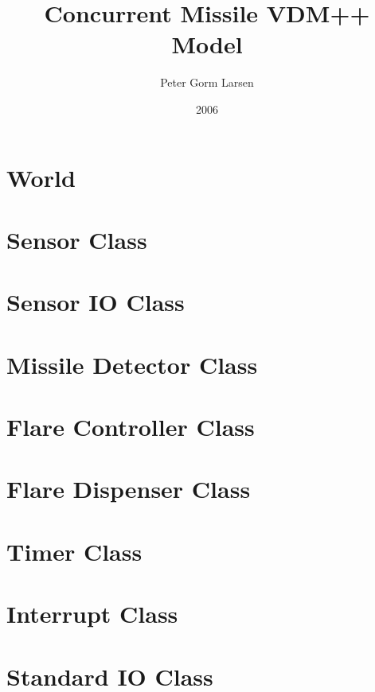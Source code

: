 \documentclass[\pformat,12pt]{article}
\title{Concurrent Missile VDM++ Model}
\author{Peter Gorm Larsen}
\date{2006}
\begin{document}
\maketitle


\section{World}


\section{Sensor Class}



\section{Sensor IO Class}



\section{Missile Detector Class}



\section{Flare Controller Class}



\section{Flare Dispenser Class}



\section{Timer Class}



\section{Interrupt Class}



\section{Standard IO Class}


\end{document}
